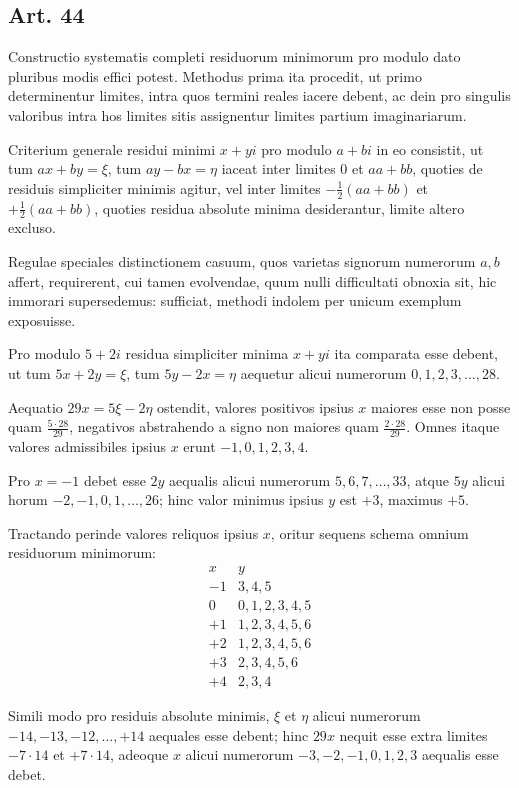 \documentclass[12pt]{article}
\newcommand{\art}[1]{\subsection*{Art. #1}}
\begin{document}
\art{44}
Constructio systematis completi residuorum minimorum pro modulo dato pluribus modis effici potest. Methodus prima ita procedit, ut primo determinentur limites, intra quos termini reales iacere debent, ac dein pro singulis valoribus intra hos limites sitis assignentur limites partium imaginariarum.

Criterium generale residui minimi $x+yi$ pro modulo $a+bi$ in eo consistit, ut tum $ax+by=\xi$, tum $ay-bx=\eta$ iaceat inter limites $0$ et $aa+bb$, quoties de residuis simpliciter minimis agitur, vel inter limites $-\frac12(aa+bb)$ et $+\frac12(aa+bb)$, quoties residua absolute minima desiderantur, limite altero excluso.

Regulae speciales distinctionem casuum, quos varietas signorum numerorum $a,b$ affert, requirerent, cui tamen evolvendae, quum nulli difficultati obnoxia sit, hic immorari supersedemus: sufficiat, methodi indolem per unicum exemplum exposuisse.

Pro modulo $5+2i$ residua simpliciter minima $x+yi$ ita comparata esse debent, ut tum $5x+2y=\xi$, tum $5y-2x=\eta$ aequetur alicui numerorum $0,1,2,3,\ldots,28$.

Aequatio $29x=5\xi-2\eta$ ostendit, valores positivos ipsius $x$ maiores esse non posse quam $\frac{5\cdot28}{29}$, negativos abstrahendo a signo non maiores quam $\frac{2\cdot28}{29}$. Omnes itaque valores admissibiles ipsius $x$ erunt $-1,0,1,2,3,4$.

Pro $x=-1$ debet esse $2y$ aequalis alicui numerorum $5,6,7,\ldots,33$, atque $5y$ alicui horum $-2,-1,0,1,\ldots,26$; hinc valor minimus ipsius $y$ est $+3$, maximus $+5$.

Tractando perinde valores reliquos ipsius $x$, oritur sequens schema omnium residuorum minimorum:
\[
\begin{array}{r|l}
x&y\\ \hline
-1&3,4,5\\
0&0,1,2,3,4,5\\
+1&1,2,3,4,5,6\\
+2&1,2,3,4,5,6\\
+3&2,3,4,5,6\\
+4&2,3,4
\end{array}
\]

Simili modo pro residuis absolute minimis, $\xi$ et $\eta$ alicui numerorum $-14,-13,-12,\ldots,+14$ aequales esse debent; hinc $29x$ nequit esse extra limites $-7\cdot14$ et $+7\cdot14$, adeoque $x$ alicui numerorum $-3,-2,-1,0,1,2,3$ aequalis esse debet.
\end{document}
